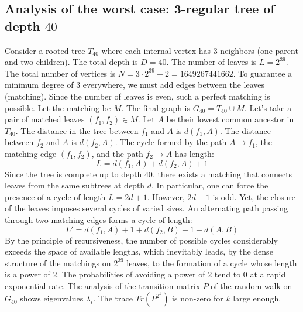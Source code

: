 \documentclass[12pt,a4paper]{article}
\begin{document}
\subsection{Analysis of the worst case: 3-regular tree of depth $40$}
Consider a rooted tree $T_{40}$ where each internal vertex has 3 neighbors (one parent and two children).
The total depth is $D = 40$.
The number of leaves is $L = 2^{39}$.
The total number of vertices is $N = 3 \cdot 2^{39} - 2 = 1649267441662$.
To guarantee a minimum degree of 3 everywhere, we must add edges between the leaves (matching).
Since the number of leaves is even, such a perfect matching is possible.
Let the matching be $M$. The final graph is $G_{40} = T_{40} \cup M$.
Let's take a pair of matched leaves $(f_1, f_2) \in M$.
Let $A$ be their lowest common ancestor in $T_{40}$.
The distance in the tree between $f_1$ and $A$ is $d(f_1, A)$.
The distance between $f_2$ and $A$ is $d(f_2, A)$.
The cycle formed by the path $A \to f_1$, the matching edge $(f_1, f_2)$, and the path $f_2 \to A$ has length:
$$ L = d(f_1, A) + d(f_2, A) + 1 $$
Since the tree is complete up to depth $40$, there exists a matching that connects leaves from the same subtrees at depth $d$.
In particular, one can force the presence of a cycle of length $L = 2d + 1$. However, $2d+1$ is odd.
Yet, the closure of the leaves imposes several cycles of varied sizes. An alternating path passing through two matching edges forms a cycle of length:
$$ L' = d(f_1, A) + 1 + d(f_2, B) + 1 + d(A, B) $$
By the principle of recursiveness, the number of possible cycles considerably exceeds the space of available lengths, which inevitably leads, by the dense structure of the matchings on $2^{39}$ leaves, to the formation of a cycle whose length is a power of 2. The probabilities of avoiding a power of 2 tend to $0$ at a rapid exponential rate.
The analysis of the transition matrix $P$ of the random walk on $G_{40}$ shows eigenvalues $\lambda_i$. The trace $Tr(P^{2^k})$ is non-zero for $k$ large enough.
\end{document}
